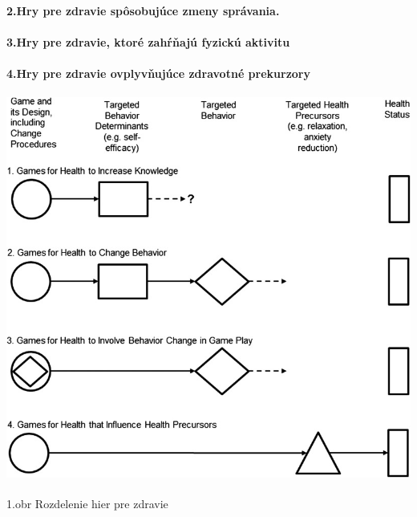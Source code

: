 \documentclass[10pt,oneside,slovak,a4paper]{article}
\begin{document}
\paragraph{2.Hry pre zdravie spôsobujúce zmeny správania.}
\paragraph{3.Hry pre zdravie, ktoré zahŕňajú fyzickú aktivitu}
\paragraph{4.Hry pre zdravie ovplyvňujúce zdravotné prekurzory}
\paragraph{\includegraphics[scale=2]{tps_1.jpeg}}
\caption{1.obr Rozdelenie hier pre zdravie}
\end{document}
